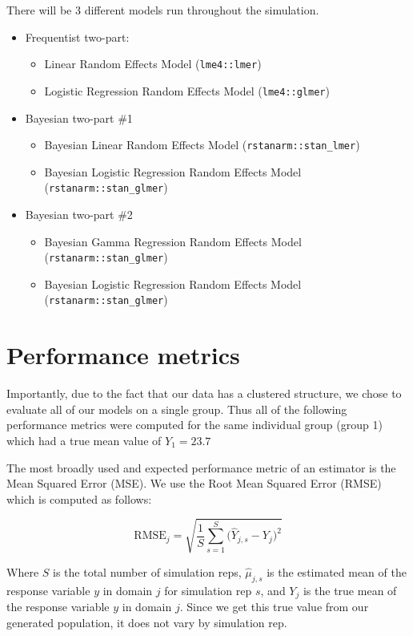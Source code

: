 \documentclass[12pt,twoside]{reedthesis}
\providecommand{\tightlist}{%
  \setlength{\itemsep}{0pt}\setlength{\parskip}{0pt}}
\begin{document}
There will be 3 different models run throughout the simulation.
\begin{itemize}
\tightlist
\item
  Frequentist two-part:
  \begin{itemize}
  \tightlist
  \item
    Linear Random Effects Model (\texttt{lme4::lmer})
  \item
    Logistic Regression Random Effects Model (\texttt{lme4::glmer})
  \end{itemize}
\item
  Bayesian two-part \#1
  \begin{itemize}
  \tightlist
  \item
    Bayesian Linear Random Effects Model (\texttt{rstanarm::stan\_lmer})
  \item
    Bayesian Logistic Regression Random Effects Model (\texttt{rstanarm::stan\_glmer})
  \end{itemize}
\item
  Bayesian two-part \#2
  \begin{itemize}
  \tightlist
  \item
    Bayesian Gamma Regression Random Effects Model (\texttt{rstanarm::stan\_glmer})
  \item
    Bayesian Logistic Regression Random Effects Model (\texttt{rstanarm::stan\_glmer})
  \end{itemize}
\end{itemize}
\hypertarget{metrics}{%
\section{Performance metrics}\label{metrics}}

Importantly, due to the fact that our data has a clustered structure, we chose to evaluate all of our models on a single group. Thus all of the following performance metrics were computed for the same individual group (group 1) which had a true mean value of \(Y_1 = 23.7\)

The most broadly used and expected performance metric of an estimator is the Mean Squared Error (MSE). We use the Root Mean Squared Error (RMSE) which is computed as follows:

\[
\text{RMSE}_j  = \sqrt{\frac{1}{S}\sum_{s = 1}^{S}\bigg(\hat{Y}_{j, s} - Y_{j}\bigg)^2}
\]

Where \(S\) is the total number of simulation reps, \(\hat{\mu}_{j, s}\) is the estimated mean of the response variable \(y\) in domain \(j\) for simulation rep \(s\), and \(Y_{j}\) is the true mean of the response variable \(y\) in domain \(j\). Since we get this true value from our generated population, it does not vary by simulation rep.
\end{document}
